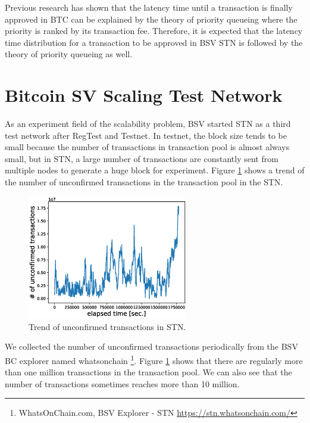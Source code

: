 \documentclass[graybox]{svmult}
\begin{document}
Previous research\cite{KK2019} has shown that the latency time until a transaction is finally approved in BTC can be explained by the theory of priority queueing where the priority is ranked by its transaction fee.
Therefore, it is expected that the latency time distribution for a transaction to be approved in BSV STN is followed by the theory of priority queueing as well. 



\section{Bitcoin SV Scaling Test Network}
\label{sec:stn}

As an experiment field of the scalability problem, BSV started STN as a third test network after RegTest and Testnet. 
In testnet, the block size tends to be small because the number of transactions in transaction pool is almost always small, but in STN, a large number of transactions are constantly sent from multiple nodes to generate a huge block for experiment. 
Figure \ref{fig:unconfirmed_tx} shows a trend of the number of unconfirmed transactions in the transaction pool in the STN. 
%
\begin{figure}[t]
  \vspace{-35mm}
  \begin{center}
    \includegraphics[width=70mm]{time_vs_tx-plot.eps}
  \end{center}
  \vspace{35mm}
  \caption{Trend of unconfirmed transactions in STN.}
  \label{fig:unconfirmed_tx}
\end{figure}
%
We collected the number of unconfirmed transactions periodically from the BSV BC explorer named whatsonchain \footnote{WhatsOnChain.com, BSV Explorer - STN \url{https://stn.whatsonchain.com/}}.
Figure \ref{fig:unconfirmed_tx} shows that there are regularly more than one million transactions in the transaction pool. 
We can also see that the number of transactions sometimes reaches more than 10 million.
\end{document}
